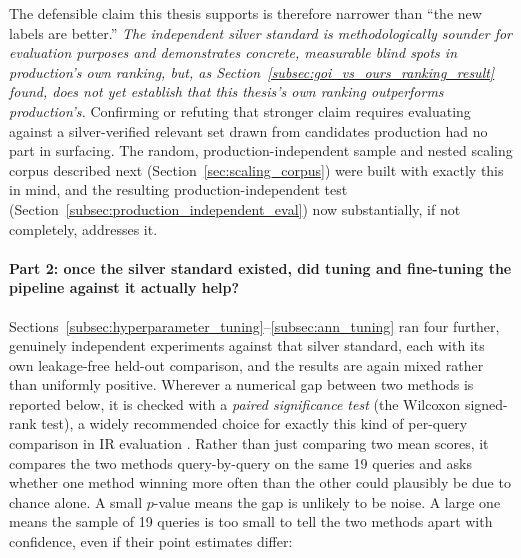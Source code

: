 \documentclass[a4paper,oneside,bibliography=totoc]{scrbook}
\begin{document}
The defensible claim this thesis supports is therefore narrower than ``the new labels are better.'' \emph{The independent silver standard is methodologically sounder for evaluation purposes and demonstrates concrete, measurable blind spots in production's own ranking, but, as Section~\ref{subsec:goi_vs_ours_ranking_result} found, does not yet establish that this thesis's own ranking outperforms production's.} Confirming or refuting that stronger claim requires evaluating against a silver-verified relevant set drawn from candidates production had no part in surfacing. The random, production-independent sample and nested scaling corpus described next (Section~\ref{sec:scaling_corpus}) were built with exactly this in mind, and the resulting production-independent test (Section~\ref{subsec:production_independent_eval}) now substantially, if not completely, addresses it.

\paragraph{Part 2: once the silver standard existed, did tuning and fine-tuning the pipeline against it actually help?} Sections~\ref{subsec:hyperparameter_tuning}--\ref{subsec:ann_tuning} ran four further, genuinely independent experiments against that silver standard, each with its own leakage-free held-out comparison, and the results are again mixed rather than uniformly positive. Wherever a numerical gap between two methods is reported below, it is checked with a \emph{paired significance test} (the Wilcoxon signed-rank test), a widely recommended choice for exactly this kind of per-query comparison in IR evaluation \citep{smucker2007comparison}. Rather than just comparing two mean scores, it compares the two methods query-by-query on the same 19 queries and asks whether one method winning more often than the other could plausibly be due to chance alone. A small $p$-value means the gap is unlikely to be noise. A large one means the sample of 19 queries is too small to tell the two methods apart with confidence, even if their point estimates differ:
\end{document}
